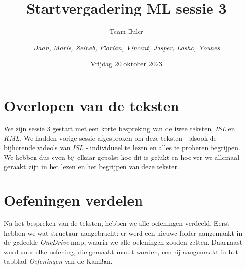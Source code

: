 \documentclass{article}
\title{Startvergadering ML sessie 3}
\author{Team $\exists$uler \and
	\textit{Daan, Marie, Zeineb, Florian, Vincent, Jasper, Lasha, Younes}}
\date{Vrijdag 20 oktober 2023}
\begin{document}
	
	\maketitle
	
	\section*{Overlopen van de teksten}
	
	We zijn sessie 3 gestart met een korte bespreking van de twee teksten, \textit{ISL} en \textit{KML}. We hadden vorige sessie afgesproken om deze teksten - alsook de bijhorende video's van \textit{ISL} - individueel te lezen en alles te proberen begrijpen. We hebben dus even bij elkaar gepolst hoe dit is gelukt en hoe ver we allemaal geraakt zijn in het lezen en het begrijpen van deze teksten.
	
	\section*{Oefeningen verdelen}
	
	Na het bespreken van de teksten, hebben we alle oefeningen verdeeld. Eerst hebben we wat structuur aangebracht: er werd een nieuwe folder aangemaakt in de gedeelde \textit{OneDrive} map, waarin we alle oefeningen zouden zetten. Daarnaast werd voor elke oefening, die gemaakt moest worden, een rij aangemaakt in het tabblad \textit{Oefeningen} van de KanBan.
	
\end{document}
